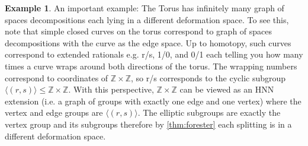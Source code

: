 \documentclass[12pt,parskip=full]{report}
\theoremstyle{plain}
\theoremstyle{definition}
\newtheorem{exa}[thm]{Example}
\begin{document}
\begin{exa}

An important example: The Torus has infinitely many graph of spaces decompositions each lying in a different deformation space. To see this, note that simple closed curves on the torus correspond to graph of spaces decompositions with the curve as the edge space. Up to homotopy, such curves correspond to extended rationals e.g. r/s, 1/0, and 0/1 each telling you how many times a curve wraps around both directions of the torus. The wrapping numbers correspond to coordinates of \(\mathbb{Z}\times \mathbb{Z}\), so r/s corresponds to the cyclic subgroup \(\langle (r,s)\rangle\leq \mathbb{Z}\times \mathbb{Z}\). With this perspective, \(\mathbb{Z}\times \mathbb{Z}\) can be viewed as an HNN extension (i.e. a graph of groups with exactly one edge and one vertex) where the vertex and edge groups are \(\langle (r,s)\rangle\). The elliptic subgroups are exactly the vertex group and its subgroups therefore by  \ref{thm:forester} each splitting is in a different deformation space.











\end{exa}
\end{document}
